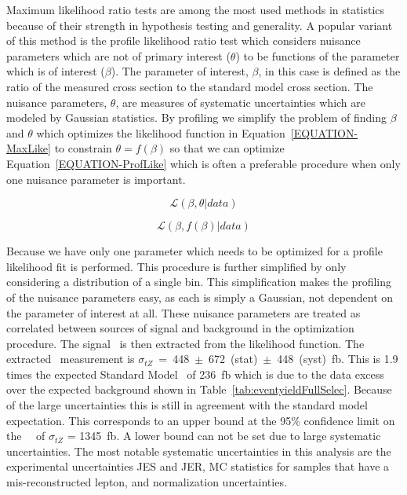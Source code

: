 Maximum likelihood ratio tests are among the most used methods in statistics because of their strength in hypothesis testing and generality. A popular variant of this method is the profile likelihood ratio test which considers nuisance parameters which are not of primary interest ($\theta$) to be functions of the  parameter which is of interest ($\beta$). The parameter of interest, $\beta$, in this case is defined as the ratio of the measured cross section to the standard model cross section. The nuisance parameters, $\theta$, are measures of systematic uncertainties which are modeled by Gaussian statistics. By profiling we simplify the problem of finding $\beta$ and $\theta$ which optimizes the likelihood function in Equation~\ref{EQUATION-MaxLike} to constrain $\theta = f(\beta )$ so that we can optimize Equation~\ref{EQUATION-ProfLike} which is often a preferable procedure when only one nuisance parameter is important.

\begin{equation}
\mathcal{L}(\beta ,\theta |data) 
\label{EQUATION-MaxLike}
\end{equation}

\begin{equation}
\mathcal{L}(\beta ,f(\beta )|data)
\label{EQUATION-ProfLike}
\end{equation}

Because we have only one parameter which needs to be optimized for a profile likelihood fit is performed. This procedure is further simplified by only considering a distribution of a single bin. This simplification makes the profiling of the nuisance parameters easy, as each is simply a Gaussian, not dependent on the parameter of interest at all. These nuisance parameters are treated as correlated between sources of signal and background in the optimization procedure. The signal \xs~is then extracted from the likelihood function. The extracted \xs~measurement is $\sigma_{tZ}$~=~448~$\pm$~672~(stat)~$\pm$~448~(syst)~fb. This is 1.9 times the expected Standard Model \xs~of 236~fb which is due to the data excess over the expected background shown in Table~\ref{tab:eventyieldFullSelec}. Because of the large uncertainties this is still in agreement with the standard model expectation. This corresponds to an upper bound at the 95\% confidence limit on the \tz~\xs~of $\sigma_{tZ}$ = 1345~fb. A lower bound can not be set due to large systematic uncertainties. The most notable systematic uncertainties in this analysis are the experimental uncertainties JES and JER, MC statistics for samples that have a mis-reconstructed lepton, and normalization uncertainties.  

